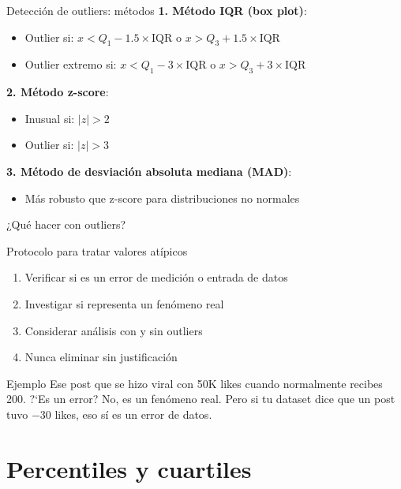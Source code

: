 \documentclass[aspectratio=169, 11pt]{beamer}
\begin{document}
\begin{frame}{Detección de outliers: métodos}
\textbf{1. Método IQR (box plot)}:
\begin{itemize}
\item Outlier si: $x < Q_1 - 1.5 \times \text{IQR}$ o $x > Q_3 + 1.5 \times \text{IQR}$
\item Outlier extremo si: $x < Q_1 - 3 \times \text{IQR}$ o $x > Q_3 + 3 \times \text{IQR}$
\end{itemize}

\textbf{2. Método z-score}:
\begin{itemize}
\item Inusual si: $|z| > 2$
\item Outlier si: $|z| > 3$
\end{itemize}

\textbf{3. Método de desviación absoluta mediana (MAD)}:
\begin{itemize}
\item Más robusto que z-score para distribuciones no normales
\end{itemize}
\end{frame}

\begin{frame}{¿Qué hacer con outliers?}
\begin{alertblock}{Protocolo para tratar valores atípicos}
\begin{enumerate}
\item Verificar si es un error de medición o entrada de datos
\item Investigar si representa un fenómeno real
\item Considerar análisis con y sin outliers
\item Nunca eliminar sin justificación
\end{enumerate}
\end{alertblock}

\vspace{1em}
\begin{exampleblock}{Ejemplo}
Ese post que se hizo viral con 50K likes cuando normalmente recibes 200. ?`Es un error? No, es un fen\'omeno real. Pero si tu dataset dice que un post tuvo $-30$ likes, eso s\'i es un error de datos.
\end{exampleblock}
\end{frame}

\section{Percentiles y cuartiles}
\end{document}
